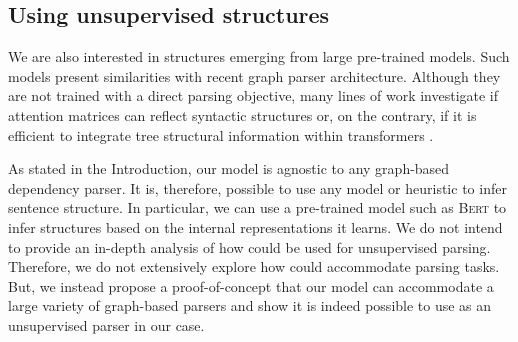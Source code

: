 

\subsection{Using unsupervised structures}


We are also interested in structures emerging from large pre-trained models. Such models present similarities with recent graph parser architecture. Although they are not trained with a direct parsing objective, many lines of work investigate if attention matrices can reflect syntactic structures \parencite{jawahar_19, clark_19, ravishankar_21} or, on the contrary, if it is efficient to integrate tree structural information within transformers \parencite{wang_19, bai_21}. 

As stated in the Introduction, our model is agnostic to any graph-based dependency parser. It is, therefore, possible to use any model or heuristic to infer sentence structure. 
In particular, we can use a pre-trained model such as \textsc{Bert} to infer structures based on the internal representations it learns. We do not intend to provide an in-depth analysis of how \bert could be used for unsupervised parsing. Therefore, we do not extensively explore how \bert could accommodate parsing tasks. But, we instead propose a proof-of-concept that our model can accommodate a large variety of graph-based parsers and show it is indeed possible to use \bert as an unsupervised parser in our case.

